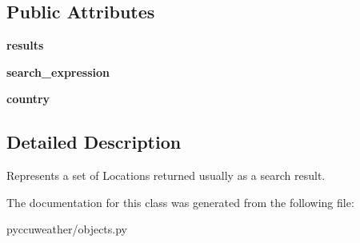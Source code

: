 \subsection*{Public Attributes}
\begin{DoxyCompactItemize}
\item 
\hypertarget{classpyccuweather_1_1objects_1_1_location_set_a5f63f2f977086d7c01d2c0f51eb6f4d0}{}{\bfseries results}\label{classpyccuweather_1_1objects_1_1_location_set_a5f63f2f977086d7c01d2c0f51eb6f4d0}

\item 
\hypertarget{classpyccuweather_1_1objects_1_1_location_set_a364247fec86f6ce933fc477e1058ba98}{}{\bfseries search\+\_\+expression}\label{classpyccuweather_1_1objects_1_1_location_set_a364247fec86f6ce933fc477e1058ba98}

\item 
\hypertarget{classpyccuweather_1_1objects_1_1_location_set_ab2e81d7a058dd87a8cbce8fcaae63317}{}{\bfseries country}\label{classpyccuweather_1_1objects_1_1_location_set_ab2e81d7a058dd87a8cbce8fcaae63317}

\end{DoxyCompactItemize}


\subsection{Detailed Description}
\begin{DoxyVerb}Represents a set of Locations returned usually as a search result.
\end{DoxyVerb}
 

The documentation for this class was generated from the following file\+:\begin{DoxyCompactItemize}
\item 
pyccuweather/objects.\+py\end{DoxyCompactItemize}
